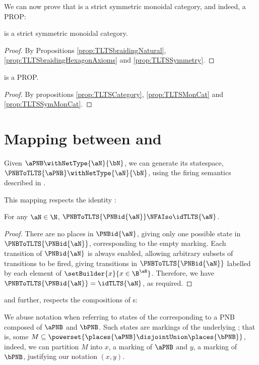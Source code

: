 We can now prove that \TLTSCat{} is a strict symmetric monoidal category, and
indeed, a PROP:

\begin{proposition}\label{prop:TLTSSymMonCat}
    \TLTSCat{} is a strict symmetric monoidal category.
\end{proposition}
\begin{proof}
    By Propositions \ref{prop:TLTSbraidingNatural},
    \ref{prop:TLTSbraidingHexagonAxioms} and \ref{prop:TLTSSymmetry}.
\end{proof}

\begin{proposition}
    \TLTSCat{} is a PROP.
\end{proposition}
\begin{proof}
    By propositions \ref{prop:TLTSCategory}, \ref{prop:TLTSMonCat} and
    \ref{prop:TLTSSymMonCat}.
\end{proof}

\section{Mapping between \PNBCat{} and \TLTSCat{}}

Given $\aPNB \withNetType{\aN}{\bN}$, we can generate its \TLTS{} statespace,
$\PNBToTLTS{\aPNB} \withNetType{\aN}{\bN}$, using the firing semantics
described in .

This mapping respects the identity \PNB{}:

\begin{proposition}\label{prop:functorId}
    For any $\aN \in \N$, $\PNBToTLTS{\PNBid{\aN}} \NFAIso \idTLTS{\aN}$.
\end{proposition}
\begin{proof}
    There are no places in $\PNBid{\aN}$, giving only one possible state in
    $\PNBToTLTS{\PNBid{\aN}}$, corresponding to the empty marking.  Each
    transition of $\PNBid{\aN}$ is always enabled, allowing arbitrary subsets
    of transitions to be fired, giving transitions in
    $\PNBToTLTS{\PNBid{\aN}}$ labelled by each element of $\setBuilder{x}{x \in
    \B^\aN}$. Therefore, we have $\PNBToTLTS{\PNBid{\aN}} = \idTLTS{\aN}$, as
    required.
\end{proof}

and further, respects the compositions of \PNB{}s:

We abuse notation when referring to states of the \TLTS{} corresponding to a
PNB composed of $\aPNB$ and $\bPNB$. Such states are markings of the
underlying \PNB; that is, some $M \subseteq \powerset{\places{\aPNB}
\disjointUnion \places{\bPNB}}$, indeed, we can partition $M$ into $x$, a
marking of $\aPNB$ and $y$, a marking of $\bPNB$, justifying our notation $(x,
y)$.

